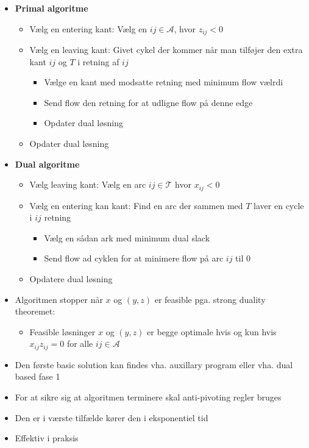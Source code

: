 \begin{itemize}
  \item \textbf{Primal algoritme}
  \begin{itemize}
    \item Vælg en entering kant: Vælg en $ij \in \mathcal A$, hvor $z_{ij} < 0$
    \item Vælg en leaving kant: Givet cykel der kommer når man tilføjer den extra kant $ij$ og $T$ i retning af $ij$
    \begin{itemize}
    	\item Vælge en kant med modsatte retning med minimum flow vælrdi
      \item Send flow den retning for at udligne flow på denne edge
      \item Opdater dual løsning
    \end{itemize}
    \item Opdater dual løsning

  \end{itemize}
  \item \textbf{Dual algoritme}
  \begin{itemize}
    \item Vælg leaving kant: Vælg en arc $ij \in \mathcal T$ hvor $x_{ij} <0$ 
    \item Vælg en entering kan kant: Find en arc der sammen med $T$ laver en cycle i $ij$ retning
    \begin{itemize}
    	\item Vælg en sådan ark med minimum dual slack
      \item Send flow ad cyklen for at minimere flow på arc $ij$ til $0$ 
    \end{itemize}
    \item Opdatere dual løsning
  \end{itemize}
  \item Algoritmen stopper når $x$ og $(y,z)$ er feasible pga. strong duality theoremet:
  \begin{itemize}
  	\item Feasible løsninger $x$ og $(y,z)$ er begge optimale hvis og kun hvis $x_{ij}z_{ij} = 0$ for alle $ij \in \mathcal A$
  \end{itemize} 
  \item Den første basic solution kan findes vha. auxillary program eller vha. dual based fase 1
  \item For at sikre sig at algoritmen terminere skal anti-pivoting regler bruges
  \item Den er i værste tilfælde kører den i eksponentiel tid 
  \item Effektiv i praksis
\end{itemize} 

